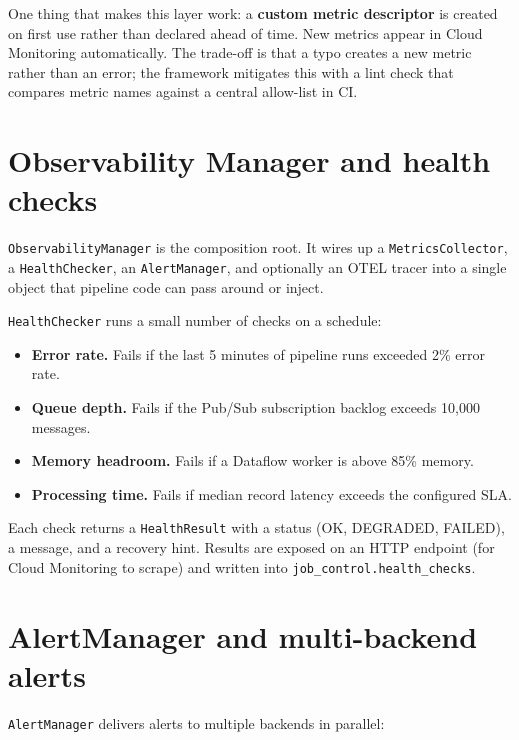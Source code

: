 \documentclass[
  11pt,
  british,
  oneside]{book}
\providecommand{\tightlist}{%
  \setlength{\itemsep}{0pt}\setlength{\parskip}{0pt}}
\begin{document}
One thing that makes this layer work: a \textbf{custom metric
descriptor} is created on first use rather than declared ahead of time.
New metrics appear in Cloud Monitoring automatically. The trade-off is
that a typo creates a new metric rather than an error; the framework
mitigates this with a lint check that compares metric names against a
central allow-list in CI.

\hypertarget{observability-manager-and-health-checks}{%
\section{Observability Manager and health
checks}\label{observability-manager-and-health-checks}}

\texttt{ObservabilityManager} is the composition root. It wires up a
\texttt{MetricsCollector}, a \texttt{HealthChecker}, an
\texttt{AlertManager}, and optionally an OTEL tracer into a single
object that pipeline code can pass around or inject.

\texttt{HealthChecker} runs a small number of checks on a schedule:

\begin{itemize}
\tightlist
\item
  \textbf{Error rate.} Fails if the last 5 minutes of pipeline runs
  exceeded 2\% error rate.
\item
  \textbf{Queue depth.} Fails if the Pub/Sub subscription backlog
  exceeds 10,000 messages.
\item
  \textbf{Memory headroom.} Fails if a Dataflow worker is above 85\%
  memory.
\item
  \textbf{Processing time.} Fails if median record latency exceeds the
  configured SLA.
\end{itemize}

Each check returns a \texttt{HealthResult} with a status (OK, DEGRADED,
FAILED), a message, and a recovery hint. Results are exposed on an HTTP
endpoint (for Cloud Monitoring to scrape) and written into
\texttt{job\_control.health\_checks}.

\hypertarget{alertmanager-and-multi-backend-alerts}{%
\section{AlertManager and multi-backend
alerts}\label{alertmanager-and-multi-backend-alerts}}

\texttt{AlertManager} delivers alerts to multiple backends in parallel:
\end{document}
